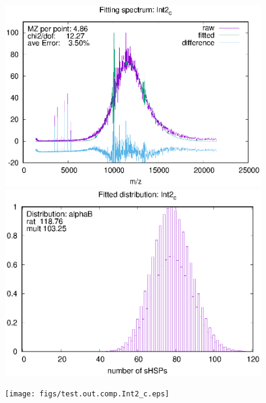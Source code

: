 \documentclass[a4paper,12pt]{report}
\begin{document}
\begin{figure}
\begin{minipage}[l]{0.323333\linewidth}
\centering
\includegraphics[trim=0mm 0mm 0mm 0mm, clip=true,width=1\textwidth]{figs/test.outInt2_c.eps}
\end{minipage}
\begin{minipage}[l]{0.323333\linewidth}
\centering
\includegraphics[trim=0mm 0mm 0mm 0mm, clip=true,width=1\textwidth]{figs/test.inpInt2_c.eps}
\end{minipage}
\begin{minipage}[l]{0.323333\linewidth}
\centering
\texttt{[image: figs/test.out.comp.Int2\_c.eps]}
\end{minipage}


\end{figure}
\end{document}
